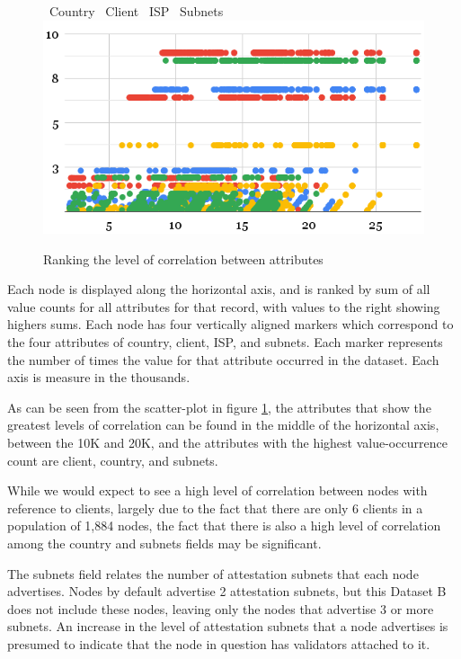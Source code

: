 \documentclass[conference]{IEEEtran}
\begin{document}
\begin{figure}[htbp]
    \centering
    \LARGE \textcolor{bluebullet}\textbullet\ \normalsize Country %
    \LARGE \textcolor{redbullet}\textbullet\ \normalsize Client %
    \LARGE \textcolor{yellowbullet}\textbullet\ \normalsize ISP %
    \LARGE \textcolor{greenbullet}\textbullet\ \normalsize Subnets
    \includegraphics[width=1\linewidth]{figures/node-correlation-ranking.png}
    \caption{Ranking the level of correlation between attributes}
    \label{fig:attribute-correlation-ranking}
\end{figure}

Each node is displayed along the horizontal axis, and is ranked by sum of all value counts for all attributes for that record, with values to the right showing highers sums.  Each node has four vertically aligned markers which correspond to the four attributes of country, client, ISP, and subnets.  Each marker represents the number of times the value for that attribute occurred in the dataset.  Each axis is measure in the thousands.

As can be seen from the scatter-plot in figure \ref{fig:attribute-correlation-ranking}, the attributes that show the greatest levels of correlation can be found in the middle of the horizontal axis, between the 10K and 20K, and the attributes with the highest value-occurrence count are client, country, and subnets.

While we would expect to see a high level of correlation between nodes with reference to clients, largely due to the fact that there are only 6 clients in a population of 1,884 nodes, the fact that there is also a high level of correlation among the country and subnets fields may be significant.

The subnets field relates the number of attestation subnets that each node advertises.  Nodes by default advertise 2 attestation subnets, but this Dataset B does not include these nodes, leaving only the nodes that advertise 3 or more subnets.  An increase in the level of attestation subnets that a node advertises is presumed to indicate that the node in question has validators attached to it.
\end{document}
